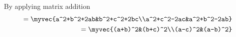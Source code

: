 By applying matrix addition
\begin{align}
=\myvec{a^2+b^2+2ab&b^2+c^2+2bc\\a^2+c^2-2ac&a^2+b^2-2ab}\\
=\myvec{(a+b)^2&(b+c)^2\\(a-c)^2&(a-b)^2}
\end{align}
